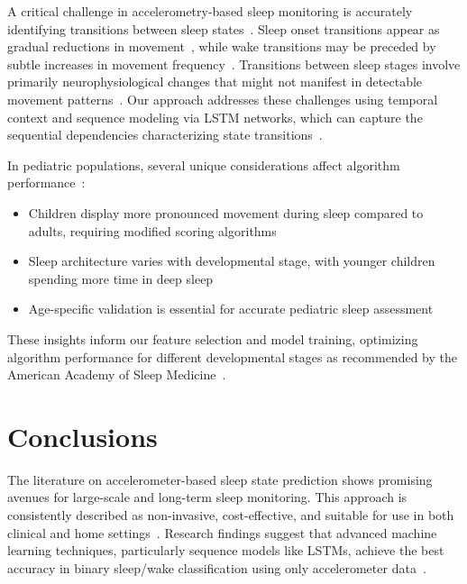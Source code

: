 \documentclass[conference]{IEEEtran}
\begin{document}
A critical challenge in accelerometry-based sleep monitoring is accurately identifying transitions between sleep states~\cite{aasm2015, littner2003}. Sleep onset transitions appear as gradual reductions in movement~\cite{sadeh1994activity}, while wake transitions may be preceded by subtle increases in movement frequency~\cite{kushida2001}. Transitions between sleep stages involve primarily neurophysiological changes that might not manifest in detectable movement patterns~\cite{rechtschaffen1968, sadeh2011}. Our approach addresses these challenges using temporal context and sequence modeling via LSTM networks, which can capture the sequential dependencies characterizing state transitions~\cite{borbely1982}.

In pediatric populations, several unique considerations affect algorithm performance~\cite{arXiv2023, acebo2006}:

\begin{itemize}
	\item Children display more pronounced movement during sleep compared to adults, requiring modified scoring algorithms~\cite{sadeh2011, acebo2006}
	\item Sleep architecture varies with developmental stage, with younger children spending more time in deep sleep~\cite{rechtschaffen1968, aasm2007}
	\item Age-specific validation is essential for accurate pediatric sleep assessment~\cite{sadeh2011}
\end{itemize}

These insights inform our feature selection and model training, optimizing algorithm performance for different developmental stages as recommended by the American Academy of Sleep Medicine~\cite{littner2003, sadeh2011}.

\section{Conclusions}

The literature on accelerometer-based sleep state prediction shows promising avenues for large-scale and long-term sleep monitoring. This approach is consistently described as non-invasive, cost-effective, and suitable for use in both clinical and home settings~\cite{pmc4883440, researchgate2021, sadeh2011, littner2003}. Research findings suggest that advanced machine learning techniques, particularly sequence models like LSTMs, achieve the best accuracy in binary sleep/wake classification using only accelerometer data~\cite{zhang2020machine, behar2013}.
\end{document}
